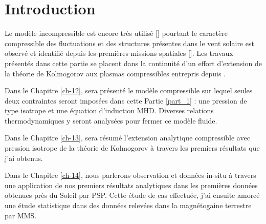 \chapter*{Introduction}
 \adjustmtc
\renewcommand\partie{\Partie\ INTRO}
\label{ch-10}

Le modèle incompressible est encore très utilisé [\cite{marino_scaling_2023}] pourtant le caractère compressible des fluctuations et des structures présentes dans le vent solaire est observé et identifié depuis les premières missions spatiales [\cite{tu_mhd_1995}]. Les travaux présentés dans cette partie se placent dans la continuité d'un effort d'extension de la théorie de Kolmogorov aux plasmas compressibles entrepris depuis \cite{banerjee_exact_2013}. 

Dans le Chapitre \ref{ch-12}, sera présenté le modèle compressible sur lequel seules deux contraintes seront imposées dans cette Partie \ref{part_1} : une pression de type isotrope et une équation d'induction \ac{MHD}. Diverses relations thermodynamiques y seront analysées pour fermer ce modèle fluide. 

Dans le Chapitre \ref{ch-13}, sera résumé l'extension analytique compressible avec pression isotrope de la théorie de Kolmogorov à travers les premiers résultats que j'ai obtenus. 

Dans le Chapitre \ref{ch-14}, nous parlerons observation et données in-situ à travers une application de nos premiers résultats analytiques dans les premières données obtenues près du Soleil par \ac{PSP}. Cette étude de cas effectuée, j'ai ensuite amorcé une étude statistique dans des données relevées dans la magnétogaine terrestre par \ac{MMS}. 

         
